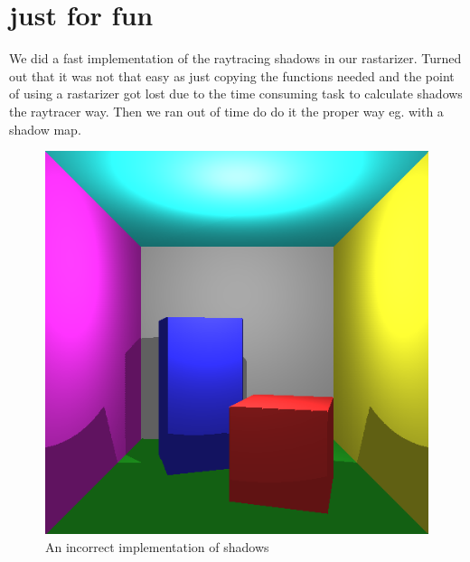 \documentclass[a4paper,11pt]{article}
\begin{document}
\section{just for fun}
We did a fast implementation of the raytracing shadows in our rastarizer. Turned out that it was not that easy as just copying the functions needed and the point of using a rastarizer got lost due to the time consuming task to calculate shadows the raytracer way. Then we ran out of time do do it the proper way eg. with a shadow map.
\begin{figure}[h!]
	\centering
	\includegraphics[width=0.4\linewidth]{shadows.png}
	\caption{An incorrect implementation of shadows}
	\label{shadows}
\end{figure}
\end{document}
